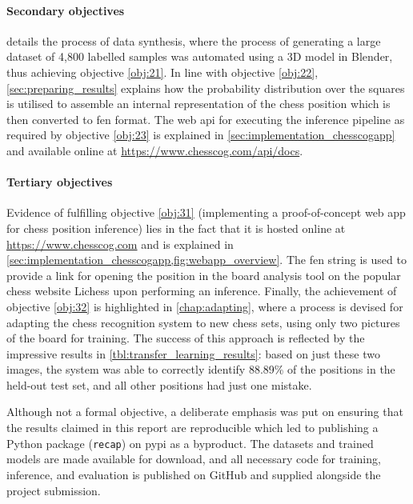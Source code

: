 \documentclass[../main.tex]{subfiles}
\begin{document}
\paragraph{Secondary objectives}
 details the process of data synthesis, where the process of generating a large dataset of 4,800 labelled samples was automated using a 3D model in Blender, thus achieving objective \ref{obj:21}.
In line with objective \ref{obj:22}, \cref{sec:preparing_results} explains how the probability distribution over the squares is utilised to assemble an internal representation of the chess position which is then converted to \gls{fen} format.
The web \gls{api} for executing the inference pipeline as required by objective \ref{obj:23} is explained in \cref{sec:implementation_chesscogapp} and available online at \url{https://www.chesscog.com/api/docs}.

\paragraph{Tertiary objectives}
Evidence of fulfilling objective \ref{obj:31} (implementing a proof-of-concept web app for chess position inference) lies in the fact that it is hosted online at \url{https://www.chesscog.com} and is explained in \cref{sec:implementation_chesscogapp,fig:webapp_overview}.
The \gls{fen} string is used to provide a link for opening the position in the board analysis tool on the popular chess website Lichess upon performing an inference.
Finally, the achievement of objective \ref{obj:32} is highlighted in \cref{chap:adapting}, where a process is devised for adapting the chess recognition system to new chess sets, using only two pictures of the board for training.
The success of this approach is reflected by the impressive results in \cref{tbl:transfer_learning_results}: based on just these two images, the system was able to correctly identify 88.89\% of the positions in the held-out test set, and all other positions had just one mistake.

Although not a formal objective, a deliberate emphasis was put on ensuring that the results claimed in this report are reproducible which led to publishing a Python package (\texttt{recap}) on \gls{pypi} as a byproduct.
The datasets and trained models are made available for download, and all necessary code for training, inference, and evaluation is published on GitHub and supplied alongside the project submission.
\end{document}

